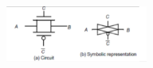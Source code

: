 \centering
\includegraphics[width=0.35\textwidth]{C8_7.png}\\
\raggedright






























































